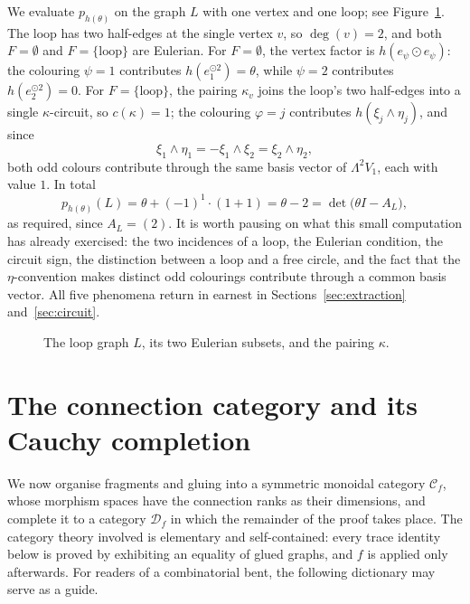 \documentclass[11pt]{article}
\newcommand{\conncat}{\mathcal{C}_{f}}            %
\newcommand{\cauchy}{\mathcal{D}_{f}}             %
\begin{document}
We evaluate $p_{h(\theta)}$ on the graph $L$ with one vertex and one
loop; see Figure~\ref{fig:definitionfive}. The loop has two
half-edges at the single vertex $v$, so $\deg(v)=2$, and both
$F=\emptyset$ and $F=\{\text{loop}\}$ are Eulerian. For
$F=\emptyset$, the vertex factor is
$h(e_{\psi}\odot e_{\psi})$: the colouring $\psi=1$ contributes
$h(e_{1}^{\odot 2})=\theta$, while $\psi=2$ contributes
$h(e_{2}^{\odot 2})=0$. For $F=\{\text{loop}\}$, the pairing
$\kappa_{v}$ joins the loop's two half-edges into a single
$\kappa$-circuit, so $c(\kappa)=1$; the
colouring $\varphi=j$ contributes $h(\xi_{j}\wedge\eta_{j})$, and
since
\[
\xi_{1}\wedge\eta_{1}
=-\xi_{1}\wedge\xi_{2}
=\xi_{2}\wedge\eta_{2},
\]
both odd colours contribute through the same basis vector of
$\Lambda^{2}V_{1}$, each with value $1$. In total
\[
p_{h(\theta)}(L)
=\theta+(-1)^{1}\cdot(1+1)
=\theta-2
=\det\bigl(\theta I-A_{L}\bigr),
\]
as required, since $A_{L}=(2)$. It is worth pausing on what this
small computation has already exercised: the two incidences of a
loop, the Eulerian condition, the circuit sign, the
distinction between a loop and a free circle, and the fact that the
$\eta$-convention makes distinct odd colourings contribute through a
common basis vector. All five phenomena return in earnest in
Sections~\ref{sec:extraction} and~\ref{sec:circuit}.

\begin{figure}
\centering

\caption{The loop graph $L$, its two Eulerian subsets, and the
pairing $\kappa$.}
\label{fig:definitionfive}
\end{figure}

\section{The connection category and its Cauchy
completion}\label{sec:conncat}

We now organise fragments and gluing into a symmetric monoidal
category $\conncat$, whose morphism spaces have the connection ranks
as their dimensions, and complete it to a category $\cauchy$ in which
the remainder of the proof takes place. The category theory involved is elementary and self-contained:
every trace identity below is proved by exhibiting an equality of
glued graphs, and $f$ is applied only afterwards. For readers of a
combinatorial bent, the following dictionary may serve as a guide.
\end{document}
